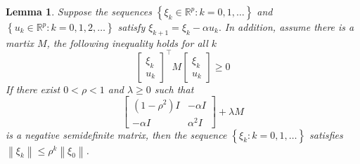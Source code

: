 \documentclass[11pt,a4paper]{article}
\newtheorem{lemma}{Lemma}
\begin{document}
\begin{lemma}
    Suppose the sequences $\left\{\xi_{k} \in \mathbb{R}^{p}: k=0,1, \ldots\right\}$ and $\left\{u_{k} \in \mathbb{R}^{p}: k=0,1,2, \ldots\right\}$ satisfy $\xi_{k+1}=\xi_{k}-\alpha u_{k} .$ In addition, assume there is a martix $M$, the following inequality holds for all $k$
    $$
    \left[\begin{array}{l}
    \xi_{k} \\
    u_{k}
    \end{array}\right]^{\top} M\left[\begin{array}{l}
    \xi_{k} \\
    u_{k}
    \end{array}\right] \geq 0
    $$
    If there exist $0<\rho<1$ and $\lambda \geq 0$ such that
    $$
    \left[\begin{array}{cc}
    \left(1-\rho^{2}\right) I & -\alpha I \\
    -\alpha I & \alpha^{2} I
    \end{array}\right]+\lambda M
    $$
    is a negative semidefinite matrix, then the sequence $\left\{\xi_{k}: k=0,1, \ldots\right\}$ satisfies $\left\|\xi_{k}\right\| \leq \rho^{k}\left\|\xi_{0}\right\|$.
\end{lemma}
\end{document}
